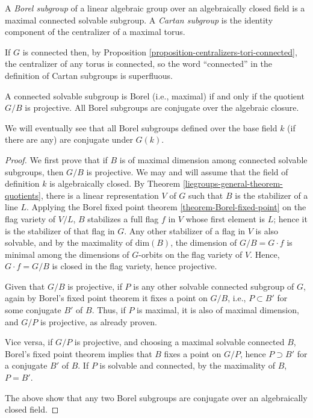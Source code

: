 \begin{definition}
\label{definition-Cartan-Borel-subgroup}
A {\it Borel subgroup} of a linear algebraic group over an algebraically closed field is a maximal connected solvable subgroup. A {\it Cartan subgroup} is the identity component of the centralizer of a maximal torus. 
\end{definition}

\begin{remark}
 \label{remark-Cartan-connected}
If $G$ is connected then, by Proposition \ref{proposition-centralizers-tori-connected}, the centralizer of any torus is connected, so the word ``connected'' in the definition of Cartan subgroups is superfluous.
\end{remark}



\begin{theorem}
\label{theorem-Borel-subgroups-conjugate}
A connected solvable subgroup is Borel (i.e., maximal) if and only if the quotient $G/B$ is projective. All Borel subgroups are conjugate over the algebraic closure.
\end{theorem}

We will eventually see that all Borel subgroups defined over the base field $k$ (if there are any) are conjugate under $G(k)$.

\begin{proof}
 

 We first prove that if $B$ is of maximal dimension among connected solvable subgroups, then $G/B$ is projective. We may and will assume that the field of definition $k$ is algebraically closed. By Theorem \ref{liegroups-general-theorem-quotients}, there is a linear representation $V$ of $G$ such that $B$ is the stabilizer of a line $L$. Applying the Borel fixed point theorem \ref{theorem-Borel-fixed-point} on the flag variety of $V/L$, $B$ stabilizes a full flag $f$ in $V$ whose first element is $L$; hence it is the stabilizer of that flag in $G$. Any other stabilizer of a flag in $V$ is also solvable, and by the maximality of $\text{dim}(B)$, the dimension of $G/B = G\cdot f$ is minimal among the dimensions of $G$-orbits on the flag variety of $V$. Hence, $G\cdot f = G/B$ is closed in the flag variety, hence projective. 
 
 Given that $G/B$ is projective, if $P$ is any other solvable connected subgroup of $G$, again by Borel's fixed point theorem it fixes a point on $G/B$, i.e., $P\subset B'$ for some conjugate $B'$ of $B$. Thus, if $P$ is maximal, it is also of maximal dimension, and $G/P$ is projective, as already proven. 
 
 
 Vice versa, if $G/P$ is projective, and choosing a maximal solvable connected $B$, Borel's fixed point theorem implies that $B$ fixes a point on $G/P$, hence $P\supset B'$ for a conjugate $B'$ of $B$. If $P$ is solvable and connected, by the maximality of $B$, $P=B'$.
 
 The above show that any two Borel subgroups are conjugate over an algebraically closed field. 
\end{proof}

